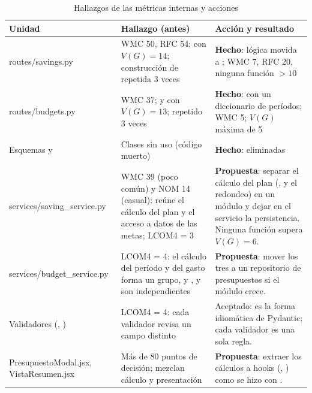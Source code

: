 \begin{table}[H]
\caption{Hallazgos de las métricas internas y acciones}
\label{tab:hallazgos-internos}
\footnotesize
\begin{tabularx}{\linewidth}{L{3.4cm} L{4.4cm} Y}
\toprule
Unidad & Hallazgo (antes) & Acción y resultado \\
\midrule
routes/savings.py & WMC 50, RFC 54;  con $V(G) = 14$; construcción de  repetida 3 veces & \textbf{Hecho}: lógica movida a ; WMC 7, RFC 20, ninguna función $> 10$ \\
routes/budgets.py & WMC 37;  y  con $V(G) = 13$;  repetido 3 veces & \textbf{Hecho}:  con un diccionario de períodos; WMC 5; $V(G)$ máxima de 5 \\
Esquemas  y  & Clases sin uso (código muerto) & \textbf{Hecho}: eliminadas \\
services/saving\_service.py & WMC 39 (poco común) y NOM 14 (casual): reúne el cálculo del plan y el acceso a datos de las metas; LCOM4 = 3 & \textbf{Propuesta}: separar el cálculo del plan (,  y el redondeo) en un módulo  y dejar en el servicio la persistencia. Ninguna función supera $V(G) = 6$. \\
services/budget\_service.py & LCOM4 = 4: el cálculo del período y del gasto forma un grupo, y ,  y  son independientes & \textbf{Propuesta}: mover los tres a un repositorio de presupuestos si el módulo crece. \\
Validadores (, ) & LCOM4 = 4: cada validador revisa un campo distinto & Aceptado: es la forma idiomática de Pydantic; cada validador es una sola regla. \\
PresupuestoModal.jsx, VistaResumen.jsx & Más de 80 puntos de decisión; mezclan cálculo y presentación & \textbf{Propuesta}: extraer los cálculos a hooks (, ) como se hizo con . \\
\bottomrule
\end{tabularx}
\end{table}

